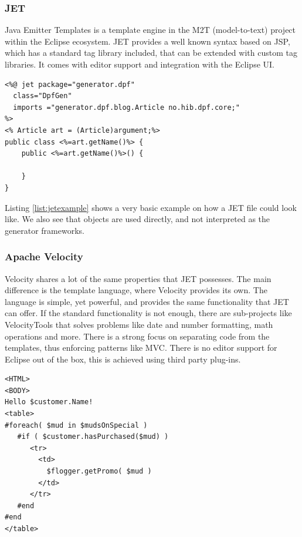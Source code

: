 \subsubsection{JET}
Java Emitter Templates is a template engine in the M2T (model-to-text) project within the Eclipse ecosystem. JET provides a well known syntax based on JSP, which  has a standard tag library included, that can be extended with custom tag libraries. It comes with editor support and integration with the Eclipse UI.

\lstset{caption=Simple example showing the JSP like syntax in JET,label=list:jetexample,captionpos=b}
\begin{table}[htbp]
  \centering
\begin{lstlisting}[showstringspaces=false]
<%@ jet package="generator.dpf"
  class="DpfGen" 
  imports ="generator.dpf.blog.Article no.hib.dpf.core;"
%>
<% Article art = (Article)argument;%>
public class <%=art.getName()%> {
    public <%=art.getName()%>() {

    }
}
\end{lstlisting}
\end{table}

Listing \ref{list:jetexample} shows a very basic example on how a JET file could look like. We also see that objects are used directly, and not interpreted as the generator frameworks.

\subsubsection{Apache Velocity}
Velocity shares a lot of the same properties that JET possesses. The main difference is the template language, where Velocity provides its own. The language is simple, yet powerful, and provides the same functionality that JET can offer. If the standard functionality is not enough, there are sub-projects like VelocityTools that solves problems like date and number formatting, math operations and more. There is a strong focus on separating code from the templates, thus enforcing patterns like MVC. There is no editor support for Eclipse out of the box, this is achieved using third party plug-ins. 

\lstset{language=HTML,caption=Example showing the Velocity template language,label=list:velocityexample,captionpos=b}
\begin{table}[ht]
  \centering
\begin{lstlisting}[showstringspaces=false]
<HTML>
<BODY>
Hello $customer.Name!
<table>
#foreach( $mud in $mudsOnSpecial )
   #if ( $customer.hasPurchased($mud) )
      <tr>
        <td>
          $flogger.getPromo( $mud )
        </td>
      </tr>
   #end
#end
</table>
\end{lstlisting}
\end{table}

